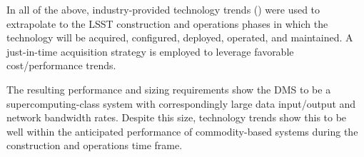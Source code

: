 In all of the above, industry-provided technology trends ()
were used to extrapolate to the LSST construction and operations phases in
which the technology will be acquired, configured, deployed, operated, and
maintained. A just-in-time acquisition strategy is employed to leverage
favorable cost/performance trends.

The resulting performance and sizing requirements show the DMS to be a
supercomputing­-class system with correspondingly large data input/output and
network bandwidth rates.  Despite this size, technology trends show this to be
well within the anticipated performance of commodity-based systems during the
construction and operations time frame.

